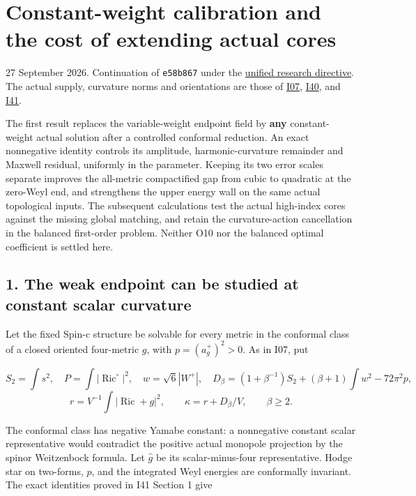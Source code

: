 \documentclass[
  11pt,
]{article}
\author{}
\date{}
\begin{document}
\hypertarget{constant-weight-calibration-and-the-cost-of-extending-actual-cores}{%
\section{Constant-weight calibration and the cost of extending actual
cores}\label{constant-weight-calibration-and-the-cost-of-extending-actual-cores}}

27 September 2026. Continuation of \texttt{e58b867} under the
\href{../guidance/source/20260927_unified_research_directive.zh.md}{unified
research directive}. The actual supply, curvature norms and orientations
are those of
\href{../mathematics/current/line1_functional_pencil.md}{I07},
\href{20260927_mixed_current_and_signed_cores.md}{I40}, and
\href{20260927_conformal_separation_and_zero_end.md}{I41}.

The first result replaces the variable-weight endpoint field by
\textbf{any} constant-weight actual solution after a controlled
conformal reduction. An exact nonnegative identity controls its
amplitude, harmonic-curvature remainder and Maxwell residual, uniformly
in the parameter. Keeping its two error scales separate improves the
all-metric compactified gap from cubic to quadratic at the zero-Weyl
end, and strengthens the upper energy wall on the same actual
topological inputs. The subsequent calculations test the actual
high-index cores against the missing global matching, and retain the
curvature-action cancellation in the balanced first-order problem.
Neither O10 nor the balanced optimal coefficient is settled here.

\hypertarget{the-weak-endpoint-can-be-studied-at-constant-scalar-curvature}{%
\subsection{1. The weak endpoint can be studied at constant scalar
curvature}\label{the-weak-endpoint-can-be-studied-at-constant-scalar-curvature}}

Let the fixed Spin-c structure be solvable for every metric in the
conformal class of a closed oriented four-metric \(g\), with
\(p=(a_g^+)^2>0\). As in I07, put

\[
 S_2=\int s^2,\quad P=\int|\operatorname{Ric}^{\circ}|^2,
 \quad w=\sqrt6|W^+|,\quad
 D_\beta=(1+\beta^{-1})S_2+(\beta+1)\int w^2-72\pi^2p,
\] \[
 r=V^{-1}\int|\operatorname{Ric}+g|^2,\qquad
 \kappa=r+D_\beta/V,\qquad \beta\ge2.
 \tag{1.1}
\]

The conformal class has negative Yamabe constant: a nonnegative constant
scalar representative would contradict the positive actual monopole
projection by the spinor Weitzenbock formula. Let \(\widehat g\) be its
scalar-minus-four representative. Hodge star on two-forms, \(p\), and
the integrated Weyl energies are conformally invariant. The exact
identities proved in I41 Section 1 give
\end{document}
